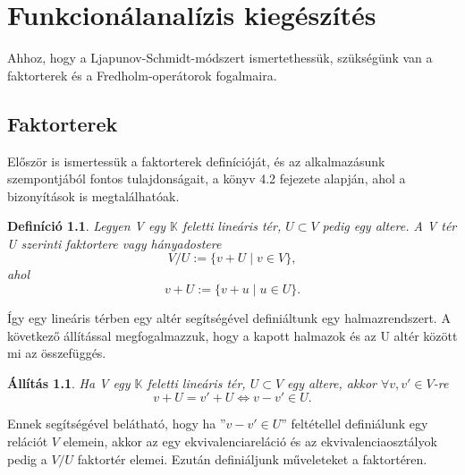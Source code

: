 \documentclass[oneside, titlepage, 12pt, a4paper]{report}
\newtheorem{definition}{Definíció}[section]
\newtheorem{statement}{Állítás}[section]
\begin{document}


\onehalfspacing
\chapter{Funkcionálanalízis kiegészítés}
\label{chap:Funcanal_ext}

Ahhoz, hogy a Ljapunov-Schmidt-módszert ismertethessük, szükségünk van a faktorterek és a Fredholm-operátorok fogalmaira.

\section{Faktorterek}
\label{sec:Faktorter}

Először is ismertessük a faktorterek definícióját, és az alkalmazásunk szempontjából fontos tulajdonságait, a \cite{faktorter} könyv 4.2 fejezete alapján, ahol a bizonyítások is megtalálhatóak.
\begin{definition}
Legyen V egy $\mathbb{K}$ feletti lineáris tér, $U \subset V$ pedig egy altere. A V tér U szerinti faktortere vagy hányadostere
\begin{equation}
V / U := \{v + U \mid v \in V\},
\end{equation}
ahol
\begin{equation}
v + U := \{v + u \mid u \in U \}.
\end{equation}
\end{definition}
Így egy lineáris térben egy altér segítségével definiáltunk egy halmazrendszert. A következő állítással megfogalmazzuk, hogy a kapott halmazok és az U altér között mi az összefüggés.
\begin{statement}
Ha V egy $\mathbb{K}$ feletti lineáris tér, $U \subset V$ egy altere, akkor $\forall v, v' \in V$-re
\begin{equation}
v + U = v' + U \Leftrightarrow v - v' \in U.
\end{equation}
\end{statement}
Ennek segítségével belátható, hogy ha  ''$v - v' \in U$'' feltétellel definiálunk egy relációt $V$ elemein, akkor az egy ekvivalenciareláció és az ekvivalenciaosztályok pedig a $V / U$ faktortér elemei. Ezután definiáljunk műveleteket a faktortéren.
\end{document}
